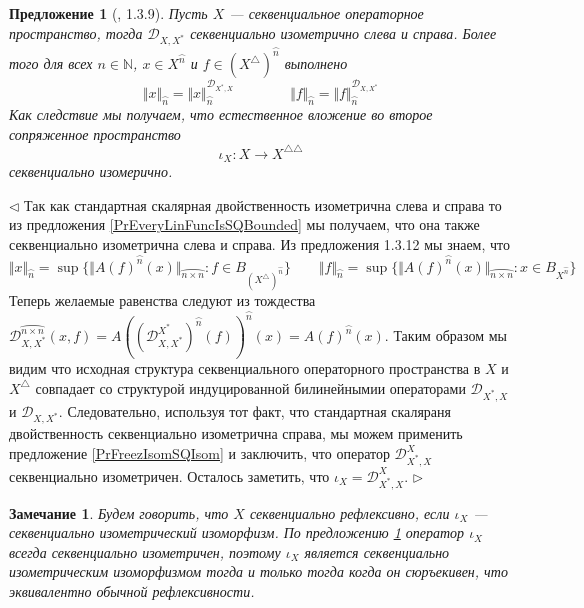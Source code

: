 \documentclass[12pt]{article}
\newtheorem{proposition}[theorem]{Предложение}
\newtheorem{remark}[theorem]{Замечание}
\newenvironment{proof}{\par $\triangleleft$}{$\triangleright$}
\begin{document}
\begin{proposition}[\cite{LamOpFolgen}, 1.3.9]\label{PrSQNormsViaDuality}
Пусть $X$ --- секвенциальное операторное пространство, тогда $\mathcal{D}_{X,X^*}$ секвенциально изометрично слева и справа. Более того для всех $n\in\mathbb{N}$, $x\in X^{\wideparen{n}}$ и $f\in (X^\triangle)^{\wideparen{n}}$ выполнено
$$
\Vert x\Vert_{\wideparen{n}}
=\Vert x\Vert_{\wideparen{n}}^{\mathcal{D}_{X^*,X}}
\qquad\qquad
\Vert f\Vert_{\wideparen{n}}
=\Vert f\Vert_{\wideparen{n}}^{\mathcal{D}_{X,X^*}}
$$
Как следствие мы получаем, что естественное вложение во второе сопряженное пространство
$$
\iota_X:X\to X^{\triangle\triangle}
$$
секвенциально изомерично.
\end{proposition}
\begin{proof}
Так как стандартная скалярная двойственность изометрична слева и справа то из предложения \ref{PrEveryLinFuncIsSQBounded} мы получаем, что она также секвенциально изометрична слева и справа. Из предложения 1.3.12 \cite{LamOpFolgen} мы знаем, что
$$
\Vert x\Vert_{\wideparen{n}}
=\sup\{\Vert A(f)^{\wideparen{n}}(x)\Vert_{\wideparen{n\times n}}: f\in B_{(X^\triangle)^{\wideparen{n}}}\}
\qquad
\Vert f\Vert_{\wideparen{n}}
=\sup\{\Vert A(f)^{\wideparen{n}}(x)\Vert_{\wideparen{n\times n}}:x\in B_{X^{\wideparen{n}}}\}
$$
Теперь желаемые равенства следуют из тождества $\mathcal{D}_{X,X^*}^{\wideparen{n\times n}}(x,f)=A((\mathcal{D}_{X,X^*}^{X^*})^{\wideparen{n}}(f))^{\wideparen{n}}(x)
=A(f)^{\wideparen{n}}(x)$. Таким образом мы видим что исходная структура секвенциального операторного пространства в $X$ и $X^\triangle$ совпадает со структурой индуцированной билинейнымии операторами $\mathcal{D}_{X^*,X}$ и $\mathcal{D}_{X,X^*}$. Следовательно, используя тот факт, что стандартная скаляраня двойственность секвенциально изометрична справа, мы можем применить предложение \ref{PrFreezIsomSQIsom} и заключить, что оператор $\mathcal{D}_{X^*,X}^X$ секвенциально изометричен. Осталось заметить, что $\iota_X=\mathcal{D}_{X^*,X}^X$. 
\end{proof}

\begin{remark}\label{RemSqReflexiv} Будем говорить, что $X$ секвенциально рефлексивно, если $\iota_X$ --- секвенциально изометрический изоморфизм. По предложению \ref{PrSQNormsViaDuality} оператор $\iota_X$ всегда секвенциально изометричен, поэтому $\iota_X$ является секвенциально изометрическим изоморфизмом тогда и только тогда когда он сюръекивен, что эквивалентно обычной рефлексивности.
\end{remark}
\end{document}
